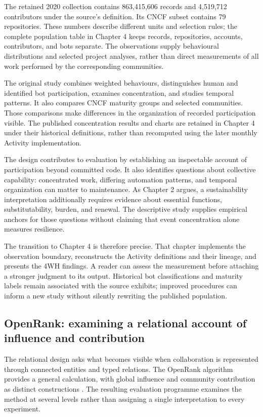 The retained 2020 collection contains 863,415,606 records and 4,519,712 contributors under the source's definition. Its CNCF subset contains 79 repositories. These numbers describe different units and selection rules; the complete population table in Chapter 4 keeps records, repositories, accounts, contributors, and bots separate. The observations supply behavioural distributions and selected project analyses, rather than direct measurements of all work performed by the corresponding communities.

The original study combines weighted behaviours, distinguishes human and identified bot participation, examines concentration, and studies temporal patterns. It also compares CNCF maturity groups and selected communities. Those comparisons make differences in the organization of recorded participation visible. The published concentration results and charts are retained in Chapter 4 under their historical definitions, rather than recomputed using the later monthly Activity implementation.

The design contributes to evaluation by establishing an inspectable account of participation beyond committed code. It also identifies questions about collective capability: concentrated work, differing automation patterns, and temporal organization can matter to maintenance. As Chapter 2 argues, a sustainability interpretation additionally requires evidence about essential functions, substitutability, burden, and renewal. The descriptive study supplies empirical anchors for those questions without claiming that event concentration alone measures resilience.

The transition to Chapter 4 is therefore precise. That chapter implements the observation boundary, reconstructs the Activity definitions and their lineage, and presents the 4WH findings. A reader can assess the measurement before attaching a stronger judgment to its output. Historical bot classifications and maturity labels remain associated with the source exhibits; improved procedures can inform a new study without silently rewriting the published population.

\subsection{OpenRank: examining a relational account of influence and contribution}
The relational design asks what becomes visible when collaboration is represented through connected entities and typed relations. The OpenRank algorithm provides a general calculation, with global influence and community contribution as distinct constructions \citep{han2026rank}. The resulting evaluation programme examines the method at several levels rather than assigning a single interpretation to every experiment.

